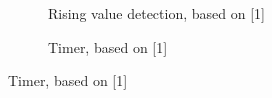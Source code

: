 \documentclass[
  a4paper,
  DIV=11,
  numbers=noendperiod]{scrartcl}
\begin{document}
\begin{figure}

\begin{minipage}{0.50\linewidth}

\begin{figure}[H]


\caption{\label{fig-generatorType3bRisingDetection}Rising value
detection, based on {[}1{]}}

\end{figure}%

\end{minipage}%
%
\begin{minipage}{0.50\linewidth}

\begin{figure}[H]


\caption{\label{fig-generatorType3bTimer}Timer, based on {[}1{]}}

\end{figure}%

\end{minipage}%

\end{figure}%
\end{document}
